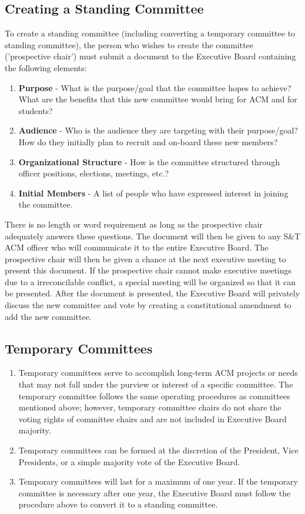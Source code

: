 \subsection{Creating a Standing Committee}
To create a standing committee (including converting a temporary committee to
standing committee), the person who wishes to create the committee ('prospective
chair') must submit a document to the Executive Board containing the following
elements:
\begin{enumerate}[label=\arabic*., nolistsep]
  \item \textbf{Purpose} - What is the purpose/goal that the committee hopes to
    achieve? What are the benefits that this new committee would bring for ACM
    and for students?
  \item \textbf{Audience} - Who is the audience they are targeting with their
    purpose/goal? How do they initially plan to recruit and on-board these new
    members?
  \item \textbf{Organizational Structure} - How is the committee structured
    through officer positions, elections, meetings, etc.?
  \item \textbf{Initial Members} - A list of people who have expressed interest
    in joining the committee.
\end{enumerate}

There is no length or word requirement as long as the prospective chair
adequately answers these questions. The document will then be given to any S\&T
ACM officer who will communicate it to the entire Executive Board. The
prospective chair will then be given a chance at the next executive meeting to
present this document. If the prospective chair cannot make executive meetings
due to a irreconcilable conflict, a special meeting will be organized so that it
can be presented. After the document is presented, the Executive Board will
privately discuss the new committee and vote by creating a constitutional
amendment to add the new committee.

\subsection{Temporary Committees}
\begin{enumerate}
  \item Temporary committees serve to accomplish long-term ACM projects or
    needs that may not fall under the purview or interest of a specific
    committee. The temporary committee follows the same operating procedures
    as committees mentioned above; however, temporary committee chairs do
    not share the voting rights of committee chairs and are not included in
    Executive Board majority.
  \item Temporary committees can be formed at the discretion of the
    President, Vice Presidents, or a simple majority vote of the Executive
    Board.
  \item Temporary committees will last for a maximum of one year. If the
    temporary committee is necessary after one year, the Executive Board must
    follow the procedure above to convert it to a standing committee.
\end{enumerate}
